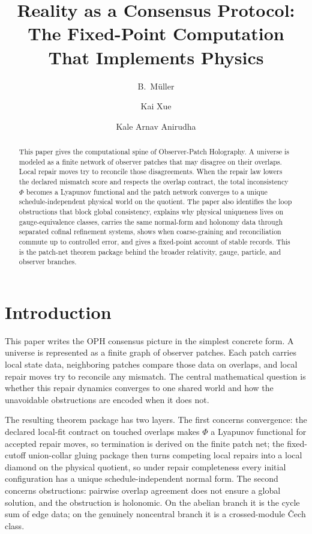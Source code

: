 \documentclass[11pt]{article}
\title{Reality as a Consensus Protocol:\\
The Fixed-Point Computation That Implements Physics}
\author{B.\ M\"uller \and Kai Xue \and Kale Arnav Anirudha}
\date{\OPHPaperReleaseDate}
\theoremstyle{remark}
\theoremstyle{plain}
\begin{document}
\maketitle
\OPHPaperReleaseBanner

\begin{abstract}
This paper gives the computational spine of Observer-Patch Holography. A universe is modeled as a finite network of observer patches that may disagree on their overlaps. Local repair moves try to reconcile those disagreements. When the repair law lowers the declared mismatch score and respects the overlap contract, the total inconsistency \(\Phi\) becomes a Lyapunov functional and the patch network converges to a unique schedule-independent physical world on the quotient. The paper also identifies the loop obstructions that block global consistency, explains why physical uniqueness lives on gauge-equivalence classes, carries the same normal-form and holonomy data through separated cofinal refinement systems, shows when coarse-graining and reconciliation commute up to controlled error, and gives a fixed-point account of stable records. This is the patch-net theorem package behind the broader relativity, gauge, particle, and observer branches.
\end{abstract}

\section{Introduction}

This paper writes the OPH consensus picture in the simplest concrete form. A universe is represented as a finite graph of observer patches. Each patch carries local state data, neighboring patches compare those data on overlaps, and local repair moves try to reconcile any mismatch. The central mathematical question is whether this repair dynamics converges to one shared world and how the unavoidable obstructions are encoded when it does not.

The resulting theorem package has two layers. The first concerns convergence: the declared
local-fit contract on touched overlaps makes \(\Phi\) a Lyapunov functional for accepted repair
moves, so termination is derived on the finite patch net; the fixed-cutoff union-collar gluing
package then turns competing local repairs into a local diamond on the physical quotient, so
under repair completeness every initial configuration has a unique schedule-independent normal
form. The second concerns obstructions: pairwise overlap agreement does not ensure a
global solution, and the obstruction is holonomic. On the abelian branch it is the cycle sum of
edge data; on the genuinely noncentral branch it is a crossed-module \v{C}ech class.
\end{document}
